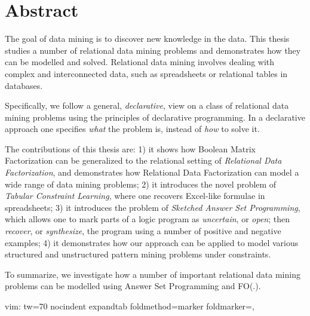 \chapter{Abstract} \label{ch:abstract}
The goal of data mining is to discover new knowledge in the data. This
thesis studies a number of relational data mining problems and
demonstrates how they can be modelled and solved. Relational data
mining involves dealing with complex and interconnected data, such as
spreadsheets or relational tables in databases. 

Specifically, we follow a general, \textit{declarative}, view on a
class of relational data mining problems using the principles of
declarative programming. In a declarative approach one specifies \textit{what} the
problem is, instead of \textit{how} to solve it. 

The contributions of this thesis are: 1) it shows how Boolean Matrix Factorization can be generalized to the
relational setting of \textit{Relational Data Factorization}, and 
demonstrates how Relational Data Factorization can model a wide range
of data mining problems; 2) it introduces the novel
problem of \textit{Tabular Constraint Learning}, where one recovers
Excel-like formulae in spreadsheets; 3) it introduces the problem of \textit{Sketched Answer Set
Programming}, which allows one to mark parts of a logic program as
\textit{uncertain}, or \textit{open}; then \textit{recover}, or
\textit{synthesize}, the program using a number of positive and
negative examples; 4) it demonstrates how our approach can be
applied to model various structured and unstructured pattern mining
problems under constraints.

\pubrev
To summarize, we investigate how a number of important relational data
mining problems can be modelled using Answer Set Programming and FO(.). 
\pubrevend

\cleardoublepage

 vim: tw=70 nocindent expandtab foldmethod=marker foldmarker={{{}{,}{}}}
